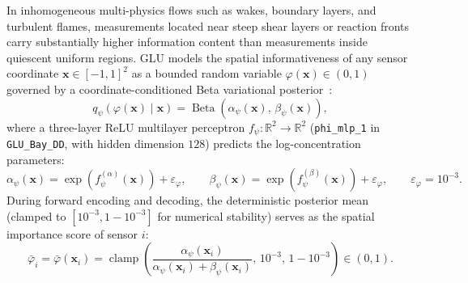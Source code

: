 In inhomogeneous multi-physics flows such as wakes, boundary layers, and turbulent flames, measurements located near steep shear layers or reaction fronts carry substantially higher information content than measurements inside quiescent uniform regions. GLU models the spatial informativeness of any sensor coordinate $\mathbf{x} \in [-1, 1]^2$ as a bounded random variable $\varphi(\mathbf{x}) \in (0, 1)$ governed by a coordinate-conditioned Beta variational posterior~\cite{figurnov2018implicit, wang2026glu}:
\begin{equation}
    q_\psi(\varphi(\mathbf{x}) \mid \mathbf{x}) = \operatorname{Beta}\!\left(\alpha_\psi(\mathbf{x}),\, \beta_\psi(\mathbf{x})\right),
    \label{eq:bg_glu_beta_dist}
\end{equation}
where a three-layer ReLU multilayer perceptron $f_\psi : \mathbb{R}^2 \rightarrow \mathbb{R}^2$ (\texttt{phi\_mlp\_1} in \texttt{GLU\_Bay\_DD}, with hidden dimension $128$) predicts the log-concentration parameters:
\begin{equation}
    \alpha_\psi(\mathbf{x}) = \exp\!\left(f_\psi^{(\alpha)}(\mathbf{x})\right) + \varepsilon_\varphi, \qquad \beta_\psi(\mathbf{x}) = \exp\!\left(f_\psi^{(\beta)}(\mathbf{x})\right) + \varepsilon_\varphi, \qquad \varepsilon_\varphi = 10^{-3}.
    \label{eq:bg_glu_alpha_beta}
\end{equation}
During forward encoding and decoding, the deterministic posterior mean (clamped to $[10^{-3}, 1 - 10^{-3}]$ for numerical stability) serves as the spatial importance score of sensor $i$:
\begin{equation}
    \bar{\varphi}_i = \bar{\varphi}(\mathbf{x}_i) = \operatorname{clamp}\!\left(\frac{\alpha_\psi(\mathbf{x}_i)}{\alpha_\psi(\mathbf{x}_i) + \beta_\psi(\mathbf{x}_i)},\, 10^{-3},\, 1 - 10^{-3}\right) \in (0, 1).
    \label{eq:bg_glu_phi_mean}
\end{equation}

